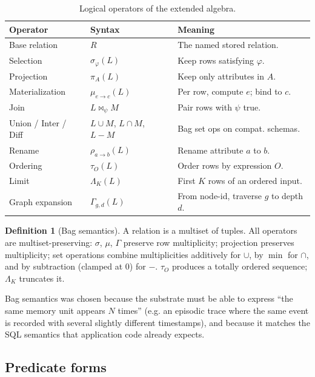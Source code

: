 \documentclass[sigconf,nonacm,review]{acmart}
\theoremstyle{plain}
\theoremstyle{definition}
\newtheorem{definition}{Definition}
\theoremstyle{remark}
\begin{document}
\begin{table}[t]
  \centering
  \scriptsize
  \begin{tabular}{@{}p{2.0cm}p{2.9cm}p{2.9cm}@{}}
    \toprule
    Operator & Syntax & Meaning \\
    \midrule
    Base relation & $R$ & The named stored relation. \\
    Selection & $\sigma_\varphi(L)$ & Keep rows satisfying $\varphi$. \\
    Projection & $\pi_A(L)$ & Keep only attributes in $A$. \\
    Materialization & $\mu_{e\to c}(L)$ & Per row, compute $e$; bind to $c$. \\
    Join & $L \bowtie_\psi M$ & Pair rows with $\psi$ true. \\
    Union / Inter / Diff & $L \cup M$, $L \cap M$, $L-M$ & Bag set ops on compat. schemas. \\
    Rename & $\rho_{a\to b}(L)$ & Rename attribute $a$ to $b$. \\
    Ordering & $\tau_O(L)$ & Order rows by expression $O$. \\
    Limit & $\Lambda_K(L)$ & First $K$ rows of an ordered input. \\
    Graph expansion & $\Gamma_{g,d}(L)$ & From node-id, traverse $g$ to depth $d$. \\
    \bottomrule
  \end{tabular}
  \caption{Logical operators of the extended algebra.}
  \label{tab:ops}
\end{table}

\begin{definition}[Bag semantics]\label{def:bag}
A relation is a multiset of tuples. All operators are
multiset-preserving: $\sigma$, $\mu$, $\Gamma$ preserve row
multiplicity; projection preserves multiplicity; set operations
combine multiplicities additively for $\cup$, by $\min$ for $\cap$,
and by subtraction (clamped at $0$) for $-$. $\tau_O$ produces a
totally ordered sequence; $\Lambda_K$ truncates it.
\end{definition}

Bag semantics was chosen because the substrate must be able to
express ``the same memory unit appears $N$ times'' (e.g. an episodic
trace where the same event is recorded with several slightly different
timestamps), and because it matches the SQL semantics that
application code already expects.

\subsection{Predicate forms}
\end{document}

